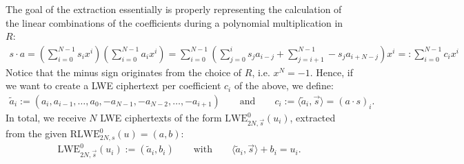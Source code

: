 \documentclass[letterpaper,10pt,english]{jupyterBook}
\begin{document}
\sphinxAtStartPar
The goal of the extraction essentially is properly representing the calculation of the linear combinations of the coefficients during a polynomial multiplication in \(R\):
\begin{equation*}
\begin{split}s\cdot a = \left( \sum_{i=0}^{N-1} s_i x^i \right) \left( \sum_{i=0}^{N-1} a_i x^i \right) = \sum_{i=0}^{N-1}\left( \sum_{j=0}^{i} s_j a_{i-j} + \sum_{j=i+1}^{N-1} - s_j a_{i+N-j}\right) x^i =: \sum_{i=0}^{N-1} c_i x^i\end{split}
\end{equation*}
\sphinxAtStartPar
Notice that the minus sign originates from the choice of \(R\), i.e. \(x^N=-1\).
Hence, if we want to create a LWE ciphertext per coefficient \(c_i\) of the above, we define:
\begin{equation*}
\begin{split}\tilde a_i := (a_i,a_{i-1},\dots,a_0,-a_{N-1},-a_{N-2},\dots,-a_{i+1}) \qquad \text{and} \qquad c_i := \langle \tilde a_i, \vec s \rangle = (a \cdot s)_i.\end{split}
\end{equation*}
\sphinxAtStartPar
In total, we receive \(N\) LWE ciphertexts of the form \(\mathrm{LWE}_{2N,\vec s}^0(u_i)\), extracted from the given \(\mathrm{RLWE}_{2N,s}^0(u) = (a,b)\):
\begin{equation*}
\begin{split}\mathrm{LWE}_{2N,\vec s}^0(u_i) := (\tilde{a}_i, b_i) \qquad \text{with} \qquad \langle \tilde a_i, \vec s \rangle + b_i = u_i.\end{split}
\end{equation*}
\end{document}
